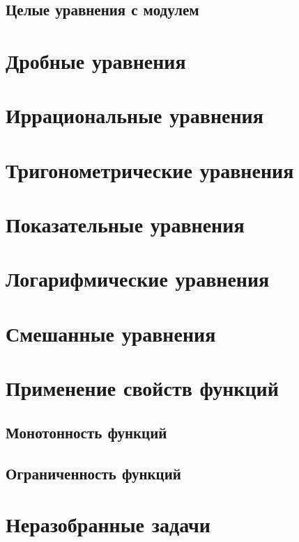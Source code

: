 \documentclass[10pt, a4paper]{article}
\begin{document}
	\subsection{Целые уравнения с модулем}
\section{Дробные уравнения}
\section{Иррациональные уравнения}
\section{Тригонометрические уравнения}
\section{Показательные уравнения}
\section{Логарифмические уравнения}
\section{Смешанные уравнения}
\section{Применение свойств функций}
	\subsection{Монотонность функций}
	\subsection{Ограниченность функций}
\section{Неразобранные задачи}
\end{document}
